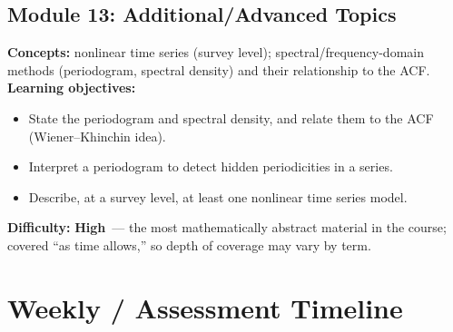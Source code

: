 \documentclass[11pt]{article}
\newcommand{\High}{\textcolor{diffHigh}{\textbf{High}}}
\newcommand{\module}[2]{\subsection*{Module #1: #2}}
\begin{document}
\module{13}{Additional/Advanced Topics}
\textbf{Concepts:} nonlinear time series (survey level); spectral/frequency-domain methods
(periodogram, spectral density) and their relationship to the ACF.\\
\textbf{Learning objectives:}
\begin{itemize}
  \item State the periodogram and spectral density, and relate them to the ACF (Wiener--Khinchin idea).
  \item Interpret a periodogram to detect hidden periodicities in a series.
  \item Describe, at a survey level, at least one nonlinear time series model.
\end{itemize}
\textbf{Difficulty:} \High\ --- the most mathematically abstract material in the course; covered ``as
time allows,'' so depth of coverage may vary by term.

\section{Weekly / Assessment Timeline}
\end{document}
